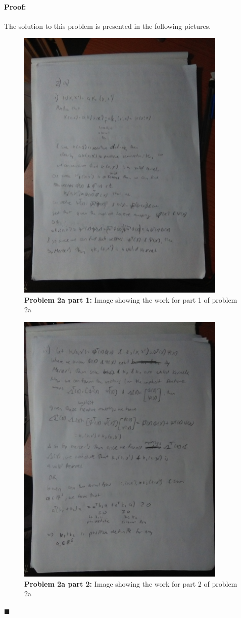 \documentclass[12pt]{article}
\newenvironment{proof}{\paragraph{Proof: }}{\hfill$\blacksquare$}
\begin{document}
\begin{proof}
The solution to this problem is presented in the following pictures.


\begin{figure}[!htbp]
\centering
\includegraphics[width=10cm]{hw3_prob2a_1.jpg}
\caption{\textbf{Problem 2a part 1:} Image showing the work for part 1 of problem 2a}
\end{figure}

\begin{figure}[!htbp]
\centering
\includegraphics[width=10cm]{hw3_prob2a_2.jpg}
\caption{\textbf{Problem 2a part 2:} Image showing the work for part 2 of problem 2a}
\end{figure}


\end{proof}
\end{document}

